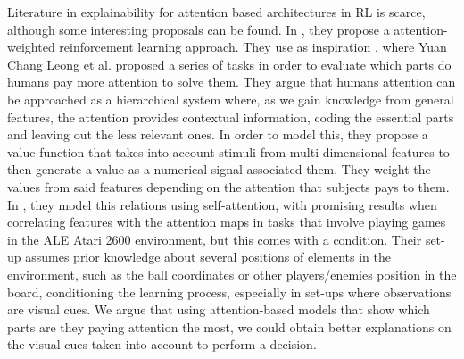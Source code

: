 Literature in explainability for attention based architectures in RL is scarce, although some interesting proposals can be found. In \cite{BRAMLAGE202210}, they propose a attention-weighted reinforcement learning approach. They use as inspiration \cite{LEONG2017451}, where Yuan Chang Leong et al. proposed a series of tasks in order to evaluate which parts do humans pay more attention to solve them. They argue that humans attention can be approached as a hierarchical system where, as we gain knowledge from general features, the attention provides contextual information, coding the essential parts and leaving out the less relevant ones. In order to model this, they propose a value function that takes into account stimuli from multi-dimensional features to then generate a value as a numerical signal associated them. They weight the values from said features depending on the attention that subjects pays to them. In \cite{BRAMLAGE202210}, they model this relations using self-attention, with promising results when correlating features with the attention maps in tasks that involve playing games in the ALE Atari 2600 environment, but this comes with a condition. Their set-up assumes prior knowledge about several positions of elements in the environment, such as the ball coordinates or other players/enemies position in the board, conditioning the learning process, especially in set-ups where observations are visual cues. We argue that using attention-based models that show which parts are they paying attention the most, we could obtain better explanations on the visual cues taken into account to perform a decision.
